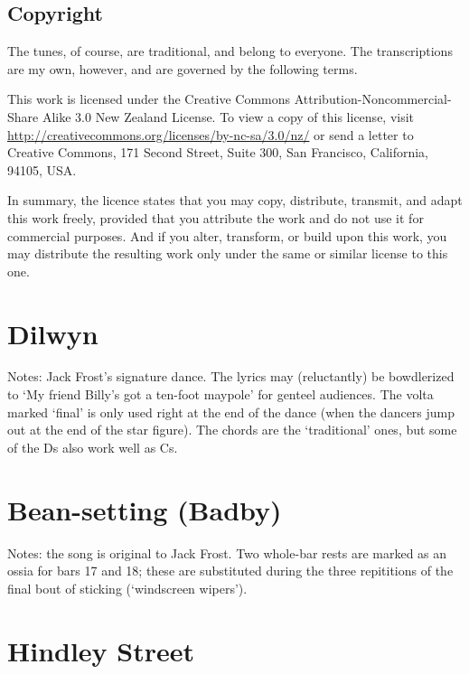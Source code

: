 \documentclass[12pt,a4paper]{article}
\begin{document}
\subsection*{Copyright}

The tunes, of course, are traditional, and belong to everyone. The 
transcriptions are my own, however, and are governed by the following terms.

This work is licensed under the Creative Commons
Attribution-Noncommercial-Share Alike 3.0 New Zealand License. To view
a copy of this license, visit
\url{http://creativecommons.org/licenses/by-nc-sa/3.0/nz/} or send a
letter to Creative Commons, 171 Second Street, Suite 300, San
Francisco, California, 94105, USA.

In summary, the licence states that you may copy, distribute,
transmit, and adapt this work freely, provided that you attribute the
work and do not use it for commercial purposes. And if you alter,
transform, or build upon this work, you may distribute the resulting
work only under the same or similar license to this one.

\pagebreak[2]

\section{Dilwyn}

\noindent Notes: Jack Frost's signature dance. The lyrics may (reluctantly) be
bowdlerized to `My friend Billy's got a ten-foot maypole' for genteel
audiences. The volta marked `final' is only used right at the end of
the dance (when the dancers jump out at the end of the star
figure). The chords are the `traditional' ones, but some of the Ds
also work well as Cs.

\pagebreak[2]

\section{Bean-setting (Badby)}
\nopagebreak
\noindent Notes: the song is original to Jack Frost. Two whole-bar rests are
marked as an ossia for bars 17 and 18; these are substituted during
the three repititions of the final bout of sticking (`windscreen
wipers').
\nopagebreak
\section{Hindley Street}
\end{document}
